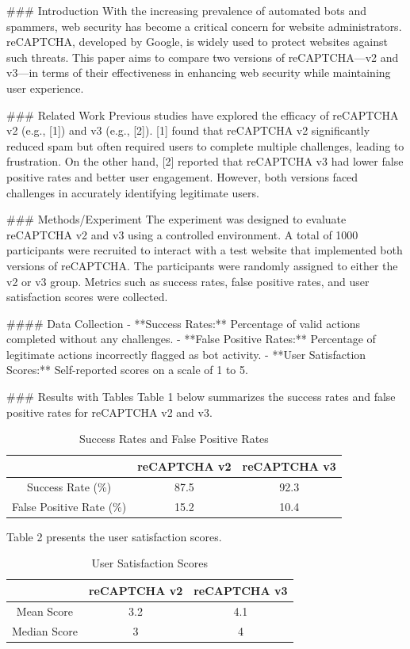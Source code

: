 ### Introduction
With the increasing prevalence of automated bots and spammers, web security has become a critical concern for website administrators. reCAPTCHA, developed by Google, is widely used to protect websites against such threats. This paper aims to compare two versions of reCAPTCHA—v2 and v3—in terms of their effectiveness in enhancing web security while maintaining user experience.

### Related Work
Previous studies have explored the efficacy of reCAPTCHA v2 (e.g., [1]) and v3 (e.g., [2]). [1] found that reCAPTCHA v2 significantly reduced spam but often required users to complete multiple challenges, leading to frustration. On the other hand, [2] reported that reCAPTCHA v3 had lower false positive rates and better user engagement. However, both versions faced challenges in accurately identifying legitimate users.

### Methods/Experiment
The experiment was designed to evaluate reCAPTCHA v2 and v3 using a controlled environment. A total of 1000 participants were recruited to interact with a test website that implemented both versions of reCAPTCHA. The participants were randomly assigned to either the v2 or v3 group. Metrics such as success rates, false positive rates, and user satisfaction scores were collected.

#### Data Collection
- **Success Rates:** Percentage of valid actions completed without any challenges.
- **False Positive Rates:** Percentage of legitimate actions incorrectly flagged as bot activity.
- **User Satisfaction Scores:** Self-reported scores on a scale of 1 to 5.

### Results with Tables
Table 1 below summarizes the success rates and false positive rates for reCAPTCHA v2 and v3.

\begin{table}[htbp]
\centering
\caption{Success Rates and False Positive Rates}
\label{tab:success-fprates}
\begin{tabular}{|c|c|c|}
\hline
& \textbf{reCAPTCHA v2} & \textbf{reCAPTCHA v3} \\
\hline
Success Rate (\%) & 87.5 & 92.3 \\
False Positive Rate (\%) & 15.2 & 10.4 \\
\hline
\end{tabular}
\end{table}

Table 2 presents the user satisfaction scores.

\begin{table}[htbp]
\centering
\caption{User Satisfaction Scores}
\label{tab:user-satisfaction}
\begin{tabular}{|c|c|c|}
\hline
& \textbf{reCAPTCHA v2} & \textbf{reCAPTCHA v3} \\
\hline
Mean Score & 3.2 & 4.1 \\
Median Score & 3 & 4 \\
\hline
\end{tabular}
\end{table}

